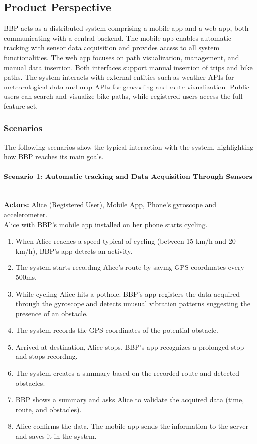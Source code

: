 \subsection{Product Perspective}
BBP acts as a distributed system comprising a mobile app and a web app, both communicating with a central backend. The mobile app enables automatic tracking with sensor data acquisition and provides access to all system functionalities. The web app focuses on path visualization, management, and manual data insertion. Both interfaces support manual insertion of trips and bike paths. The system interacts with external entities such as weather APIs for meteorological data and map APIs for geocoding and route visualization. Public users can search and visualize bike paths, while registered users access the full feature set.

\subsubsection{Scenarios}
The following scenarios show the typical interaction with the system, highlighting how BBP reaches its main goals.

\paragraph{Scenario 1: Automatic tracking and Data Acquisition Through Sensors}\mbox{}\\
\textbf{Actors:} Alice (Registered User), Mobile App, Phone's gyroscope and accelerometer.\\
Alice with BBP's mobile app installed on her phone starts cycling.
\begin{enumerate}
    \item When Alice reaches a speed typical of cycling (between 15 km/h and 20 km/h), BBP's app detects an activity.
    \item The system starts recording Alice's route by saving GPS coordinates every 500ms.
    \item While cycling Alice hits a pothole. BBP's app registers the data acquired through the gyroscope and detects unusual vibration patterns suggesting the presence of an obstacle.
    \item The system records the GPS coordinates of the potential obstacle.
    \item Arrived at destination, Alice stops. BBP's app recognizes a prolonged stop and stops recording.
    \item The system creates a summary based on the recorded route and detected obstacles.
    \item BBP shows a summary and asks Alice to validate the acquired data (time, route, and obstacles).
    \item Alice confirms the data. The mobile app sends the information to the server and saves it in the system.
\end{enumerate}

